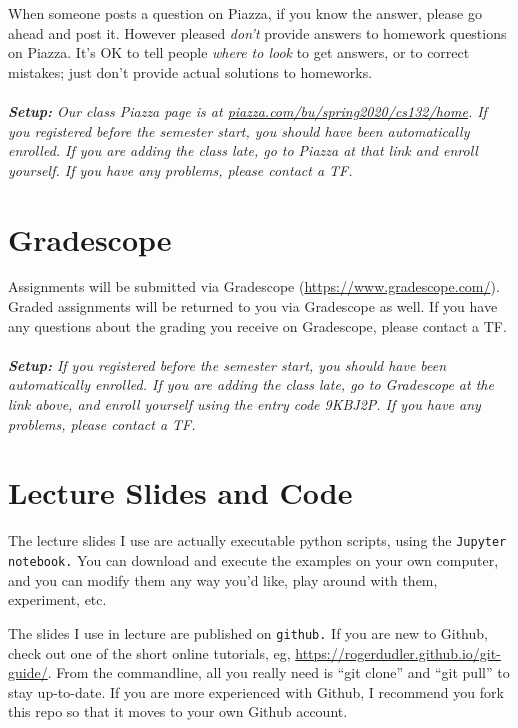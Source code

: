 \documentclass[11pt]{article}
\begin{document}
When someone posts a question on Piazza, if you know the answer, please
go ahead and post it.   However pleased \emph{don't} provide answers to homework
questions on Piazza.   It's OK to tell people \emph{where to look} to
get answers, or to correct mistakes;  just don't provide actual solutions
to homeworks.
\\
~\\\emph{\textbf{Setup:}  Our class Piazza
page  is at \url{piazza.com/bu/spring2020/cs132/home}.  If you
registered before the semester start, 
  you should have been automatically enrolled.  If you are adding the
  class late, go to Piazza at that link and enroll yourself.   If you have any
  problems, please contact a TF.}

\section*{Gradescope}

Assignments will be submitted via Gradescope
(\url{https://www.gradescope.com/}).    Graded assignments will 
be returned to you via Gradescope as well.   If you have any questions
about the grading you receive on Gradescope, please contact a TF.
\\
~\\\emph{\textbf{Setup:} If you registered before the semester start,
  you should have been automatically enrolled.  If you are adding the
  class late, go to Gradescope at the link above, and enroll yourself
  using the entry code 9KBJ2P.   If you have any
  problems, please contact a TF.}

\section*{Lecture Slides and Code} 

The lecture slides I use are actually executable python scripts, using the
\texttt{Jupyter notebook.}   You can
download and execute the examples on your own computer, and you can
modify them any way you'd like, play around with them, experiment, etc.

The slides I use in lecture are published on \texttt{github.}
  If you are new to Github, check out one of the short online tutorials,
eg, \url{https://rogerdudler.github.io/git-guide/}.  From the
commandline, all you really need is ``git clone'' and ``git pull''  to
stay up-to-date.  If you are more experienced with Github,
I recommend you fork this repo so that it moves to your own Github
account.
\end{document}
